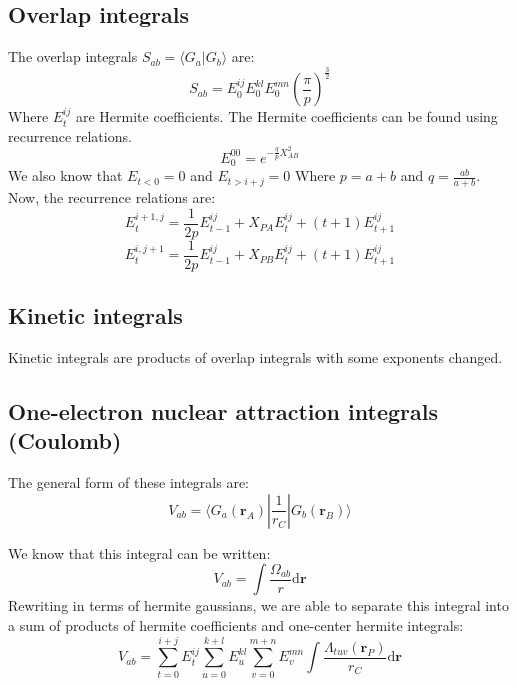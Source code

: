 \documentclass[a4paper,10pt, twocolumn, pre]{revtex4}
\newcommand{\rvec}{\mathbf{r}}
\newcommand{\dd}{\mathrm{d}}
\newcommand{\overlap}[2]{\langle {#1}|{#2} \rangle}
\newcommand{\sandwich}[3]{\langle {#1}|{#2}|{#3}\rangle}
\begin{document}
\subsection{Overlap integrals}
The overlap integrals $S_{ab} = \overlap{G_a}{G_b}$ are:
\begin{equation}
	S_{ab} = E_0^{ij}E_0^{kl}E_0^{mn}\left(\frac{\pi}{p}\right)^{\frac{3}{2}}
\end{equation}
Where $E_t^{ij}$ are Hermite coefficients. 
The Hermite coefficients can be found using recurrence relations. 
\begin{equation}
	E_0^{00} = e^{-\frac{q}{p}X_{AB}^2}
\end{equation}
We also know that $E_{t<0} = 0$ and $E_{t>i+j} = 0$
Where $p = a+b$ and $q = \frac{ab}{a+b}$.
Now, the recurrence relations are:
\begin{equation}
	E_t^{i+1,j} = \frac{1}{2p}E_{t-1}^{ij} + X_{PA}E_t^{ij} + (t+1) E_{t+1}^{ij}
\end{equation}
\begin{equation}
	E_t^{i, j+1} = \frac{1}{2p}E_{t-1}^{ij}+X_{PB}E_t^{ij} + (t+1)E_{t+1}^{ij}
\end{equation}

\subsection{Kinetic integrals}

Kinetic integrals are products of overlap integrals with some exponents changed.

\subsection{One-electron nuclear attraction integrals (Coulomb)}
The general form of these integrals are:
\begin{equation}
	V_{ab} = \sandwich{G_a(\rvec_A)}{\frac{1}{r_C}}{G_b(\rvec_B)}
\end{equation}

We know that this integral can be written:
\begin{equation}
	V_{ab} = \int \frac{\Omega_{ab}}{r}\dd \rvec  
\end{equation}
Rewriting in terms of hermite gaussians, we are able to separate this integral into a sum of products of hermite coefficients and one-center hermite integrals:
\begin{equation}
	V_{ab} = \sum_{t=0}^{i+j}E_{t}^{ij}\sum_{u=0}^{k+l}E_{u}^{kl}\sum_{v=0}^{m+n}E_{v}^{mn} \int \frac{\Lambda_{tuv}(\rvec_P)}{r_C} \dd \rvec
\end{equation}
\end{document}
